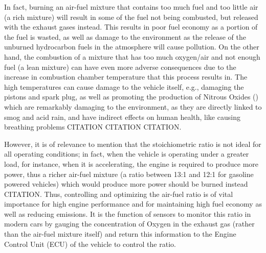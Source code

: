 \documentclass[11pt]{article}
\begin{document}
In fact, burning an air-fuel mixture that contains too much fuel and too little air (a rich mixture) will result in some of the fuel not being combusted, but released with the exhaust gases instead. This results in poor fuel economy as a portion of the fuel is wasted, as well as damage to the environment as the release of the unburned hydrocarbon fuels in the atmosphere will cause pollution. On the other hand, the combustion of a mixture that has too much oxygen/air and not enough fuel (a lean mixture) can have even more adverse consequences due to the increase in combustion chamber temperature that this process results in. The high temperatures can cause damage to the vehicle itself, e.g., damaging the pistons and spark plug, as well as promoting the production of Nitrous Oxides ()  which are remarkably damaging to the environment, as they are directly linked to smog and acid rain, and have indirect effects on human health, like causing breathing problems CITATION CITATION CITATION.

However, it is of relevance to mention that the stoichiometric ratio is not ideal for all operating conditions; in fact, when the vehicle is operating under a greater load, for instance, when it is accelerating, the engine is required to produce more power, thus a richer air-fuel mixture (a ratio between 13:1 and 12:1 for gasoline powered vehicles) which would produce more power should be burned instead CITATION. Thus, controlling and optimizing the air-fuel ratio is of vital importance for high engine performance and for maintaining high fuel economy as well as reducing emissions. It is the function of  sensors to monitor this ratio in modern cars by gauging the concentration of Oxygen in the exhaust gas (rather than the air-fuel mixture itself) and return this information to the Engine Control Unit (ECU) of the vehicle to control the ratio. 
\end{document}

